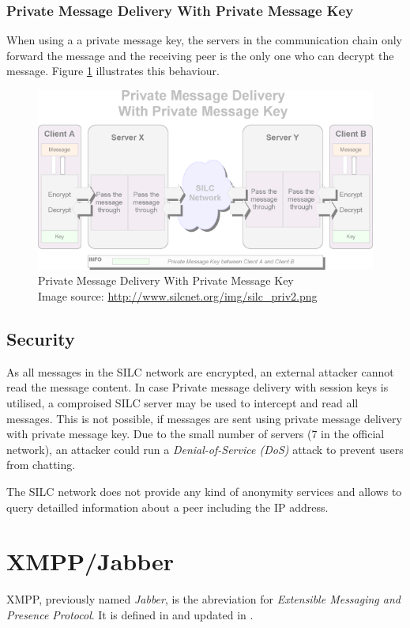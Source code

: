 \subsubsection{Private Message Delivery With Private Message Key}
When using a a private message key, the servers in the communication chain
only forward the message and the receiving peer is the only one who can
decrypt the message. Figure \ref{silcprivkey} illustrates this behaviour.
\begin{figure}
    \centering
    \caption[Silc: Private Message Delivery With Private Message Key]{Private Message Delivery With Private Message Key\\Image source: \protect\url{http://www.silcnet.org/img/silc_priv2.png}}
    \label{silcprivkey}
    \includegraphics[scale=0.8]{silc_priv2.png}
\end{figure}
\subsection{Security}
As all messages in the SILC network are encrypted, an external attacker
cannot read the message content. In case Private message delivery with session keys
is utilised, a comproised SILC server may be used to intercept and read all
messages. This is not possible, if messages are sent using
private message delivery with private message key.
Due to the small number of servers (7 in the official network),
an attacker could run a \textit{Denial-of-Service (DoS)} attack to prevent
users from chatting.

The SILC network does not provide any kind of anonymity services and allows
to query detailled information about a peer including the IP address.
\section{XMPP/Jabber}
XMPP, previously named \textit{Jabber}, is the abreviation for
\textit{Extensible Messaging and Presence Protocol}.
It is defined in \cite{rfc3920,rfc3921,rfc3922,rfc3923,rfc4622,rfc4854,rfc4979}
and updated in \cite{rfc6120,rfc6121}.

